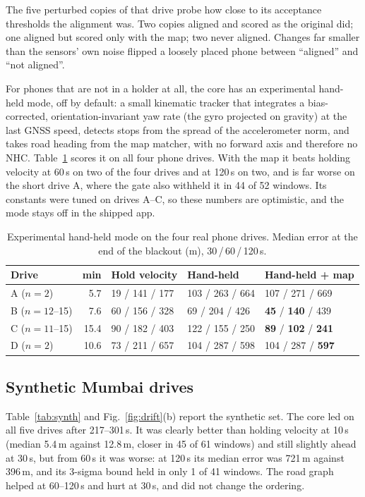 \documentclass[conference]{IEEEtran}
\begin{document}
The five perturbed copies of that drive probe how close to its acceptance
thresholds the alignment was. Two copies aligned and scored as the original
did; one aligned but scored only with the map; two never aligned. Changes far
smaller than the sensors' own noise flipped a loosely placed phone between
``aligned'' and ``not aligned''.

For phones that are not in a holder at all, the core has an experimental
hand-held mode, off by default: a small kinematic tracker that integrates a
bias-corrected, orientation-invariant yaw rate (the gyro projected on gravity)
at the last GNSS speed, detects stops from the spread of the accelerometer
norm, and takes road heading from the map matcher, with no forward axis and
therefore no NHC. Table~\ref{tab:handheld} scores it on all four phone drives.
With the map it beats holding velocity at 60\,s on two of the four drives and
at 120\,s on two, and is far worse on the short drive A, where the gate also
withheld it in 44 of 52 windows. Its constants were tuned on drives A--C, so
these numbers are optimistic, and the mode stays off in the shipped app.

\begin{table}[t]
\centering
\caption{Experimental hand-held mode on the four real phone drives. Median
error at the end of the blackout (m), 30\,/\,60\,/\,120\,s.}
\label{tab:handheld}
\setlength{\tabcolsep}{2.5pt}
\begin{tabular}{@{}lrlll@{}}
\toprule
Drive & min & Hold velocity & Hand-held & Hand-held + map\\
\midrule
A ($n{=}2$) & 5.7 & 19 / 141 / 177 & 103 / 263 / 664 & 107 / 271 / 669\\
B ($n{=}12$--15) & 7.6 & 60 / 156 / 328 & 69 / 204 / 426 & \textbf{45} / \textbf{140} / 439\\
C ($n{=}11$--15) & 15.4 & 90 / 182 / 403 & 122 / 155 / 250 & \textbf{89} / \textbf{102} / \textbf{241}\\
D ($n{=}2$) & 10.6 & 73 / 211 / 657 & 104 / 287 / 598 & 104 / 287 / \textbf{597}\\
\bottomrule
\end{tabular}
\end{table}

\subsection{Synthetic Mumbai drives}
Table~\ref{tab:synth} and Fig.~\ref{fig:drift}(b) report the synthetic set. The
core led on all five drives after 217--301\,s. It was clearly better than
holding velocity at 10\,s (median 5.4\,m against 12.8\,m, closer in 45 of 61
windows) and still slightly ahead at 30\,s, but from 60\,s it was worse:
at 120\,s its median error was 721\,m against 396\,m, and its 3-sigma bound
held in only 1 of 41 windows. The road graph helped at 60--120\,s and hurt at
30\,s, and did not change the ordering.
\end{document}
